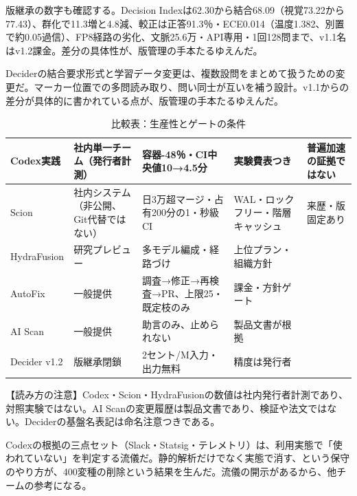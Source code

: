 \documentclass[lualatex,a4paper,10pt]{jlreq}
\begin{document}
版継承の数字も確認する。Decision Indexは62.30から結合68.09（視覚73.22から77.43）、群化で11.3増と4.8減、較正は正答91.3％・ECE0.014（温度1.382、別置で約0.05過信）、FP8経路の劣化、文脈25.6万・API専用・1回128問まで、v1.1名はv1.2課金。差分の具体性が、版管理の手本たるゆえんだ。
\cite{B37,B36,B38}


Deciderの結合要求形式と学習データ変更は、複数設問をまとめて扱うための変更だ。マーカー位置での多問読み取り、問い同士が互いを補う設計。v1.1からの差分が具体的に書かれている点が、版管理の手本たるゆえんだ。
\cite{B37,B36,B38}


\begin{table}[htbp]\centering\footnotesize
\caption{比較表：生産性とゲートの条件}
\begin{tabularx}{0.96\linewidth}{@{}lXXXX@{}}
\toprule
Codex実践 & 社内単一チーム（発行者計測） & 容器-48％・CI中央値10→4.5分 & 実験費表つき & 普遍加速の証拠ではない \cite{B31} \\
\midrule
Scion & 社内システム（非公開、Git代替ではない） & 日3万超マージ・占有200分の1・秒級CI & WAL・ロックフリー・階層キャッシュ & 来歴・版固定あり \cite{B32,B75} \\
\midrule
HydraFusion & 研究プレビュー & 多モデル編成・経路づけ & 上位プラン・組織方針 \cite{B33,B76} \\
\midrule
AutoFix & 一般提供 & 調査→修正→再検査→PR、上限25・既定枝のみ & 課金・方針ゲート \cite{B34,B77} \\
\midrule
AI Scan & 一般提供 & 助言のみ、止められない & 製品文書が根拠 \cite{B35,B78} \\
\midrule
Decider v1.2 & 版継承閉鎖 & 2セント/M入力・出力無料 & 精度は発行者 \cite{B37,B36,B38} \\
\bottomrule
\end{tabularx}
\end{table}

\begin{tcolorbox}[colback=SurveySoft,colframe=SurveyRule,arc=1mm,boxrule=0.4pt,left=2mm,right=2mm]
【読み方の注意】Codex・Scion・HydraFusionの数値は社内発行者計測であり、対照実験ではない。AI Scanの変更履歴は製品文書であり、検証や法文ではない。Deciderの基盤名表記は命名注意つきである。
\end{tcolorbox}
\cite{B31,B32,B75,B33,B76,B34,B77,B35,B78,B37,B36,B38}

Codexの根拠の三点セット（Slack・Statsig・テレメトリ）は、利用実態で「使われていない」を判定する流儀だ。静的解析だけでなく実態で消す、という保守のやり方が、400変種の削除という結果を生んだ。流儀の開示があるから、他チームの参考になる。
\cite{B31}
\end{document}
